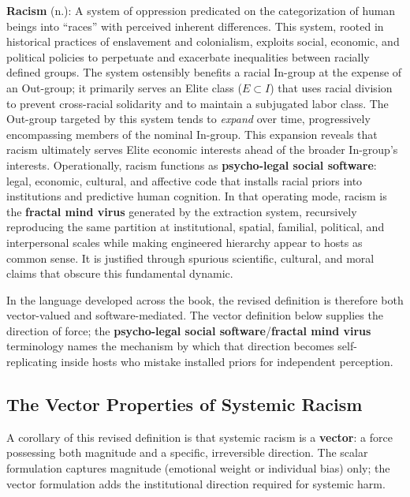 \begin{definition}
\textbf{Racism} (n.): A system of oppression predicated on the categorization of human beings into ``races'' with perceived inherent differences. This system, rooted in historical practices of enslavement and colonialism, exploits social, economic, and political policies to perpetuate and exacerbate inequalities between racially defined groups. The system ostensibly benefits a racial In-group at the expense of an Out-group; it primarily serves an Elite class ($E \subset I$) that uses racial division to prevent cross-racial solidarity and to maintain a subjugated labor class. The Out-group targeted by this system tends to \textit{expand} over time, progressively encompassing members of the nominal In-group. This expansion reveals that racism ultimately serves Elite economic interests ahead of the broader In-group's interests. Operationally, racism functions as \textbf{psycho-legal social software}: legal, economic, cultural, and affective code that installs racial priors into institutions and predictive human cognition. In that operating mode, racism is the \textbf{fractal mind virus} generated by the extraction system, recursively reproducing the same partition at institutional, spatial, familial, political, and interpersonal scales while making engineered hierarchy appear to hosts as common sense. It is justified through spurious scientific, cultural, and moral claims that obscure this fundamental dynamic.
\end{definition}

In the language developed across the book, the revised definition is therefore both vector-valued and software-mediated. The vector definition below supplies the direction of force; the \textbf{psycho-legal social software}/\textbf{fractal mind virus} terminology names the mechanism by which that direction becomes self-replicating inside hosts who mistake installed priors for independent perception.

\subsection*{The Vector Properties of Systemic Racism}

A corollary of this revised definition is that systemic racism is a \textbf{vector}: a force possessing both magnitude and a specific, irreversible direction. The scalar formulation captures magnitude (emotional weight or individual bias) only; the vector formulation adds the institutional direction required for systemic harm.

